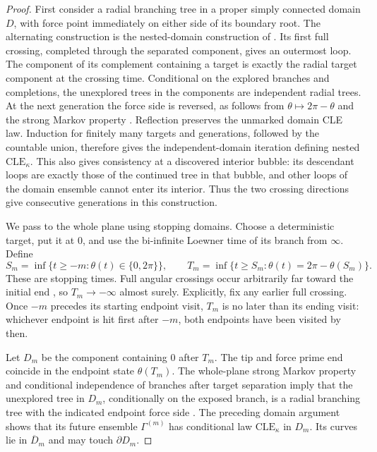 \documentclass[11pt]{article}
\numberwithin{equation}{section}
\theoremstyle{definition}
\theoremstyle{remark}
\newcommand{\1}{\mathbf 1}
\begin{document}
\begin{proof}
First consider a radial branching tree in a proper simply connected
domain $D$, with force point immediately on either side of its boundary
root.  The alternating construction is the nested-domain construction
of \cite[Section~2.1.6]{AruHoldenPowellSunCritical}.  Its first full
crossing, completed through the separated component, gives an outermost
loop.  The component of its complement containing a target is exactly
the radial target component at the crossing time.  Conditional on the
explored branches and completions, the unexplored trees in the
components are independent radial trees.  At the next generation the
force side is reversed, as follows from $\theta\mapsto2\pi-\theta$
and the strong Markov property
\cite[Remark~2.3]{AruHoldenPowellSunCritical}.  Reflection preserves the
unmarked domain CLE law.  Induction for finitely many targets and
generations, followed by the countable union, therefore gives the
independent-domain iteration defining nested $\mathrm{CLE}_{\kappa}$.
This also gives consistency at a discovered interior bubble: its
descendant loops are exactly those of the continued tree in that bubble,
and other loops of the domain ensemble cannot enter its interior.
Thus the two crossing directions give consecutive generations in this
construction.

We pass to the whole plane using stopping domains.  Choose a
deterministic target, put it at $0$, and use the bi-infinite Loewner
time of its branch from $\infty$.  Define
\[
 S_m=\inf\{t\ge -m:\theta(t)\in\{0,2\pi\}\},\qquad
 T_m=\inf\{t\ge S_m:\theta(t)=2\pi-\theta(S_m)\}.
\]
These are stopping times.  Full angular crossings occur arbitrarily
far toward the initial end
\cite[Lemma~2.7]{GwynneMillerQianCLE}, so $T_m\to-\infty$ almost
surely.  Explicitly, fix any earlier full crossing.  Once $-m$ precedes
its starting endpoint visit, $T_m$ is no later than its ending visit:
whichever endpoint is hit first after $-m$, both endpoints have been
visited by then.

Let $D_m$ be the component containing $0$ after $T_m$.  The tip and
force prime end coincide in the endpoint state $\theta(T_m)$.
The whole-plane strong Markov property and conditional
independence of branches after target separation imply that the
unexplored tree in $D_m$, conditionally on the exposed branch, is a
radial branching tree with the indicated endpoint force side
\cite[Proposition~2.2 and Section~2.1.3]{MillerSheffieldIGIV}.
The preceding domain argument shows that its future ensemble
$\Gamma^{(m)}$ has conditional law $\mathrm{CLE}_{\kappa}$ in $D_m$.
Its curves lie in $\overline D_m$ and may touch $\partial D_m$.


\end{proof}
\end{document}
